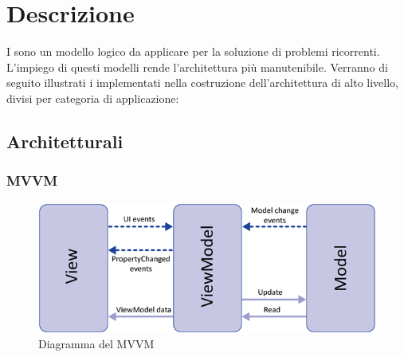 \section{Descrizione  }
I  sono un modello logico da applicare per la soluzione di problemi
ricorrenti. L’impiego di questi modelli rende l'architettura più manutenibile. Verranno
di seguito illustrati i  implementati nella costruzione dell’architettura di
alto livello, divisi per categoria di applicazione:
	\subsection{ Architetturali}
	
		\subsubsection{MVVM}
		\begin{figure}[H]
		\centering
		\includegraphics[width=0.5\linewidth]{GraficiAppendici/mvvm.png}
		\caption{Diagramma del  MVVM}
	\end{figure}
